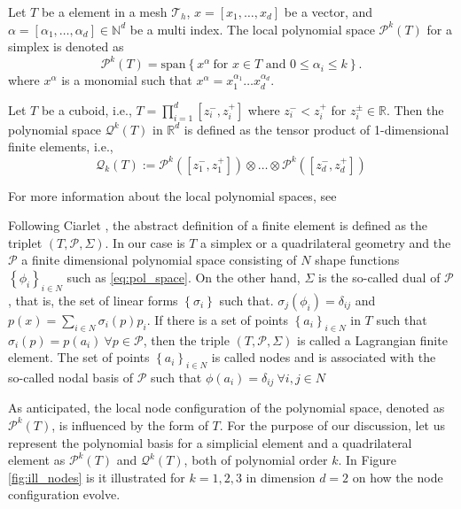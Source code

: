 \begin{definition}
    \label{def:local_space}
    Let $T$ be a element in a mesh $\mathcal{T}_{h} $,  $x = \left[ x_{1}, \ldots, x_{d} \right] $ be a vector, and $\alpha  = \left[ \alpha _{1}, \ldots, \alpha _{d} \right] \in \mathbb{N} ^{d} $ be a multi index.
    The local polynomial space $\mathcal{P} ^{k}( T) $ for a simplex is denoted as
    \begin{equation}
    \label{eq:pol_space}
        \mathcal{P}^{k}( T) =  \mathrm{span}\left\{ x^{\alpha } \ \text{for } x \in T \text{ and } 0 \le  \alpha _{i} \le k \right\}.
    \end{equation}
    where  $x^{\alpha }$ is a monomial such that $x^{\alpha } = x_{1}^{\alpha _{1}} \ldots x_{d}^{\alpha _{d}}$.

    Let $T$ be a cuboid, i.e.,  $T = \prod_{i=1}^{d} [z_{i}^{-},z_{i}^{+}]$ where $z_{i}^{-}< z_{i}^{+}$ for $z_{i}^{\pm} \in \mathbb{R} $. Then the polynomial space $\mathcal{Q}^{k}( T)$  in $\mathbb{R} ^{d}$ is defined as the tensor product of 1-dimensional
    finite elements, i.e.,
      \[
    \mathcal{Q} _{k}(T)  := \mathcal{P}^{k}( [z_{1}^{-},z_{1}^{+}] ) \otimes \ldots \otimes \mathcal{P}^{k}( [z_{d}^{-},z_{d}^{+}] )
    \]
\end{definition}
For more information about the local polynomial spaces, see \cite[Chapter 6.4, 7.3]{ErnGuermond2021}

Following Ciarlet \cite[pp.93]{ciarlet1991basic}, the abstract definition of a finite element is defined as the triplet $( T, \mathcal{P}, \Sigma ) $. In our case is $T$ a simplex or a quadrilateral geometry and the $\mathcal{P} $ a finite dimensional polynomial space consisting of $N$ shape
functions $\left\{ \phi_{i}  \right\}_{i\in N} $ such as \eqref{eq:pol_space}.
On the other hand, $\Sigma $ is the so-called dual of $\mathcal{P}$, that is, the set of linear forms $\left\{ \sigma _{i} \right\} $ such that. $ \sigma_{j} ( \phi_{i} ) = \delta _{ij}$ and $p( x) = \sum_{i\in N}^{} \sigma_{i} ( p) p_{i} $.
If there is a set of points $\left\{ a_{i} \right\}_{i \in N} $  in $T$ such that
$\sigma_{i}( p) = p( a_{i}) \  \forall p \in \mathcal{P}$,  then the triple $( T, \mathcal{P}, \Sigma  ) $ is called a Lagrangian finite element. The set of points $\left\{ a_{i} \right\}_{i \in N}  $ is called nodes and is associated with the
so-called nodal basis of $\mathcal{P} $ such that  $\phi ( a_{i}) = \delta _{ij} \ \forall i,j  \in N$

As anticipated, the local node configuration of the polynomial space, denoted as $\mathcal{P}^{k}( T)$, is influenced by the form of $T$. For the purpose of our discussion, let us represent the polynomial basis for a simplicial element and a quadrilateral
element as $\mathcal{P} ^{k}(T )$ and $\mathcal{Q} ^{k}( T)$, both of polynomial order $k$. In Figure \ref{fig:ill_nodes} is it illustrated for  $k=1,2,3$ in dimension $d=2$ on how the node configuration evolve.

